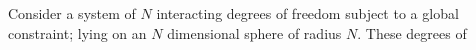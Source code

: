 Consider a system of $N$ interacting degrees of freedom subject to a global constraint; lying on an $N$ dimensional sphere of radius $N$. These degrees of 
